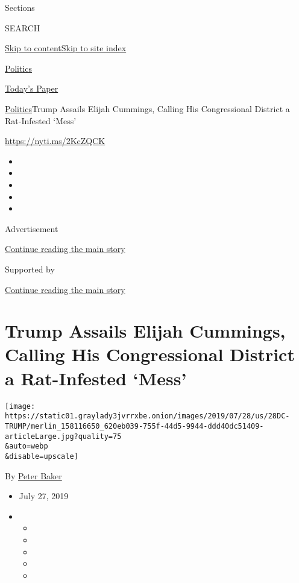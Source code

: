 Sections

SEARCH

\protect\hyperlink{site-content}{Skip to
content}\protect\hyperlink{site-index}{Skip to site index}

\href{https://www.nytimes3xbfgragh.onion/section/politics}{Politics}

\href{https://myaccount.nytimes3xbfgragh.onion/auth/login?response_type=cookie\&client_id=vi}{}

\href{https://www.nytimes3xbfgragh.onion/section/todayspaper}{Today's
Paper}

\href{/section/politics}{Politics}\textbar{}Trump Assails Elijah
Cummings, Calling His Congressional District a Rat-Infested `Mess'

\url{https://nyti.ms/2KcZQCK}

\begin{itemize}
\item
\item
\item
\item
\item
\end{itemize}

Advertisement

\protect\hyperlink{after-top}{Continue reading the main story}

Supported by

\protect\hyperlink{after-sponsor}{Continue reading the main story}

\hypertarget{trump-assails-elijah-cummings-calling-his-congressional-district-a-rat-infested-mess}{%
\section{Trump Assails Elijah Cummings, Calling His Congressional
District a Rat-Infested
`Mess'}\label{trump-assails-elijah-cummings-calling-his-congressional-district-a-rat-infested-mess}}

\texttt{[image: https://static01.graylady3jvrrxbe.onion/images/2019/07/28/us/28DC-TRUMP/merlin\_158116650\_620eb039-755f-44d5-9944-ddd40dc51409-articleLarge.jpg?quality=75\\\&auto=webp\\\&disable=upscale]}

By \href{https://www.nytimes3xbfgragh.onion/by/peter-baker}{Peter Baker}

\begin{itemize}
\item
  July 27, 2019
\item
  \begin{itemize}
  \item
  \item
  \item
  \item
  \item
  \end{itemize}
\end{itemize}


